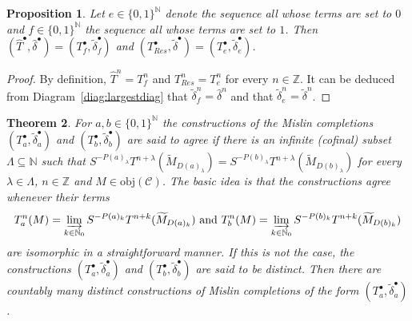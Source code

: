 \documentclass[12pt,a4paper]{article}
\numberwithin{equation}{section}
\newtheorem{thm}{Theorem}[section]
\newtheorem{prop}[thm]{Proposition}
\theoremstyle{nonumberplain}
\newtheorem{proof}{Proof}
\begin{document}
\begin{prop}
Let $e \in \lbrace 0, 1 \rbrace^{\mathbb{N}}$ denote the sequence all whose terms are set to $0$ and $f \in \lbrace 0, 1 \rbrace^{\mathbb{N}}$ the sequence all whose terms are set to $1$. Then $(\widehat{T}^{\bullet}, \widehat{\delta}^{\bullet}) = (T_f^{\bullet}, \widetilde{\delta}_f^{\bullet})$ and $(T_{Res}^{\bullet}, \widetilde{\delta}^{\bullet}) = (T_e^{\bullet}, \widetilde{\delta}_e^{\bullet})$.
\end{prop}

\begin{proof}
By definition, $\widehat{T}^n = T_f^n$ and $T_{Res}^n = T_e^n$ for every $n \in \mathbb{Z}$. It can be deduced from Diagram~\ref{diag:largestdiag} that $\widetilde{\delta}_f^n = \widehat{\delta}^n$
and that $\widetilde{\delta}_e^n = \widetilde{\delta}^n$.
\end{proof}

\begin{thm}\label{thm:countmanyconstrs}
For $a, b \in \lbrace 0, 1 \rbrace^{\mathbb{N}}$ the constructions of the Mislin completions $(T_a^{\bullet}, \widetilde{\delta}_a^{\bullet})$ and $(T_b^{\bullet}, \widetilde{\delta}_b^{\bullet})$ are said to agree if there is an infinite (cofinal) subset $\Lambda \subseteq \mathbb{N}$ such that $S^{-P(a)_{\lambda}}T^{n+{\lambda}}(\widetilde{M}_{D(a)_{\lambda}}) = S^{-P(b)_{\lambda}}T^{n+{\lambda}}(\widetilde{M}_{D(b)_{\lambda}})$ for every $\lambda \in \Lambda$, $n \in \mathbb{Z}$ and $M \in \mathrm{obj}(\mathcal{C})$. The basic idea is that the constructions agree whenever their terms
\[ T_a^n(M) = \varinjlim_{k \in \mathbb{N}_0} S^{-P(a)_k}T^{n+k}(\widetilde{M}_{D(a)_k}) \text{ and } T_b^n(M) = \varinjlim_{k \in \mathbb{N}_0} S^{-P(b)_k}T^{n+k}(\widetilde{M}_{D(b)_k}) \]
are isomorphic in a straightforward manner. If this is not the case, the constructions $(T_a^{\bullet}, \widetilde{\delta}_a^{\bullet})$ and $(T_b^{\bullet}, \widetilde{\delta}_b^{\bullet})$ are said to be distinct. Then there are countably many distinct constructions of Mislin completions of the form $(T_a^{\bullet}, \widetilde{\delta}_a^{\bullet})$.
\end{thm}
\end{document}
